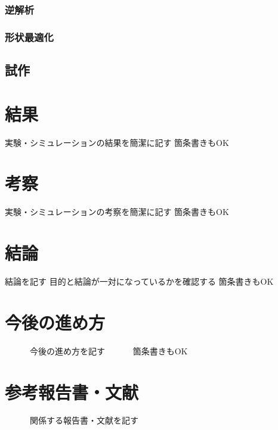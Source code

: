 \documentclass[report]{jlreq}
\begin{document}
\subsection{逆解析}
\subsection{形状最適化}


\section{試作}



\chapter{結果}
実験・シミュレーションの結果を簡潔に記す
箇条書きもOK
\chapter{考察 }
実験・シミュレーションの考察を簡潔に記す
箇条書きもOK
\chapter{結論}
結論を記す
目的と結論が一対になっているかを確認する
箇条書きもOK
\chapter{今後の進め方}
　　　今後の進め方を記す
　　　箇条書きもOK
\chapter{参考報告書・文献}
　　　関係する報告書・文献を記す
\end{document}
